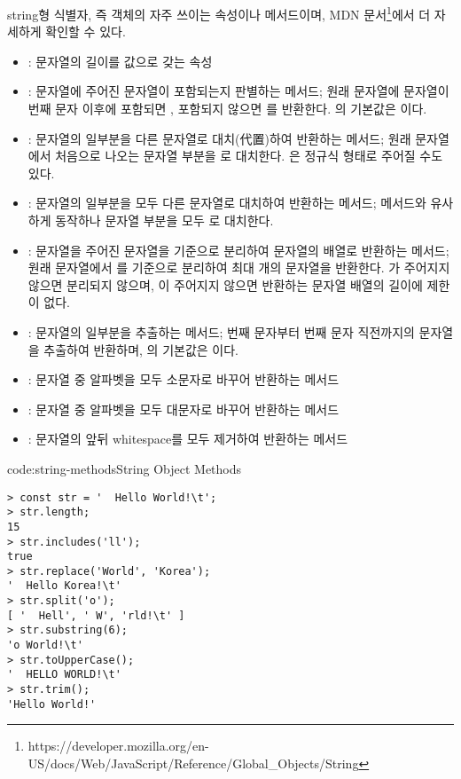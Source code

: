 string형 식별자, 즉  객체의 자주 쓰이는 속성이나 메서드이며, MDN 문서\footnote{https://developer.mozilla.org/en-US/docs/Web/JavaScript/Reference/Global\_Objects/String}에서 더 자세하게 확인할 수 있다.

\begin{itemize}
    \item {}: 문자열의 길이를 값으로 갖는 속성
    \item {}: 문자열에 주어진 문자열이 포함되는지 판별하는 메서드; 원래 문자열에  문자열이 번째 문자 이후에 포함되면 , 포함되지 않으면 를 반환한다. 의 기본값은 이다.
    \item {}: 문자열의 일부분을 다른 문자열로 대치(代置)하여 반환하는 메서드; 원래 문자열에서 처음으로 나오는  문자열 부분을 로 대치한다. 은 정규식 형태로 주어질 수도 있다.
    \item {}: 문자열의 일부분을 모두 다른 문자열로 대치하여 반환하는 메서드;  메서드와 유사하게 동작하나  문자열 부분을 모두 로 대치한다.
    \item {}: 문자열을 주어진 문자열을 기준으로 분리하여 문자열의 배열로 반환하는 메서드; 원래 문자열에서 를 기준으로 분리하여 최대 개의 문자열을 반환한다. 가 주어지지 않으면 분리되지 않으며, 이 주어지지 않으면 반환하는 문자열 배열의 길이에 제한이 없다.
    \item {}: 문자열의 일부분을 추출하는 메서드; 번째 문자부터 번째 문자 직전까지의 문자열을 추출하여 반환하며, 의 기본값은 이다.
    \item {}: 문자열 중 알파벳을 모두 소문자로 바꾸어 반환하는 메서드
    \item {}: 문자열 중 알파벳을 모두 대문자로 바꾸어 반환하는 메서드
    \item {}: 문자열의 앞뒤 whitespace를 모두 제거하여 반환하는 메서드
\end{itemize}

\begin{codeenv}{code:string-methods}{String Object Methods}\begin{verbatim}
> const str = '  Hello World!\t';
> str.length;
15
> str.includes('ll');
true
> str.replace('World', 'Korea');
'  Hello Korea!\t'
> str.split('o');
[ '  Hell', ' W', 'rld!\t' ]
> str.substring(6);
'o World!\t'
> str.toUpperCase();
'  HELLO WORLD!\t'
> str.trim();
'Hello World!'
\end{verbatim}
\end{codeenv}

